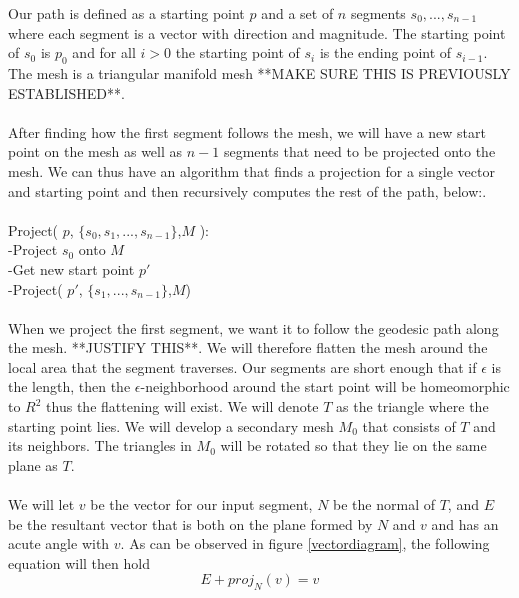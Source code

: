 Our path is defined as a starting point $p$ and a set of $n$ segments $s_0,...,s_{n-1}$ where each segment is a vector with direction and magnitude. The starting point of $s_0$ is $p_0$ and for all $i>0$ the starting point of $s_i$ is the ending point of $s_{i-1}$. The mesh is a triangular manifold mesh **MAKE SURE THIS IS PREVIOUSLY ESTABLISHED**. \\
\\
After finding how the first segment follows the mesh, we will have a new start point on the mesh as well as $n-1$ segments that need to be projected onto the mesh. We can thus have an algorithm that finds a projection for a single vector and starting point and then recursively computes the rest of the path, below:.\\
\\
Project( $p$, $\{s_0,s_1,...,s_{n-1}\}$,$M$ ):\\
-Project $s_0$ onto $M$\\
-Get new start point $p'$\\
-Project( $p'$, $\{s_1,...,s_{n-1}\}$,$M$)\\ 
\\
When we project the first segment, we want it to follow the geodesic path along the mesh. **JUSTIFY THIS**. We will therefore flatten the mesh around the local area that the segment traverses. Our segments are short enough that if $\epsilon$ is the length, then the $\epsilon$-neighborhood around the start point will be homeomorphic to $R^2$ thus the flattening will exist. We will denote $T$ as the triangle where the starting point lies. We will develop a secondary mesh $M_0$ that consists of $T$ and its neighbors. The triangles in $M_0$ will be rotated so that they lie on the same plane as $T$. \\
\\
We will let $v$ be the vector for our input segment, $N$ be the normal of $T$, and $E$ be the resultant vector that is both on the plane formed by $N$ and $v$ and has an acute angle with $v$. As can be observed in figure \ref{vectordiagram}, the following equation will then hold
\[
E + proj_N(v) = v
\]


